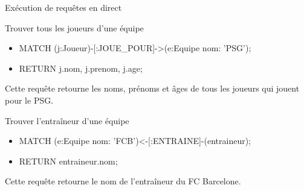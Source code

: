 \begin{frame}{Exécution de requêtes en direct}
  \begin{block}{Trouver tous les joueurs d'une équipe}
    \begin{itemize}
      \item MATCH (j:Joueur)-[:JOUE\_POUR]->(e:Equipe {nom: 'PSG'});
      \item RETURN j.nom, j.prenom, j.age;
    \end{itemize}
    Cette requête retourne les noms, prénoms et âges de tous les joueurs qui jouent pour le PSG.
  \end{block}
  \begin{block}{Trouver l'entraîneur d'une équipe}
    \begin{itemize}
      \item MATCH (e:Equipe {nom: 'FCB'})<-[:ENTRAINE]-(entraineur);
      \item RETURN entraineur.nom;
    \end{itemize}
    Cette requête retourne le nom de l'entraîneur du FC Barcelone.
  \end{block}
\end{frame}